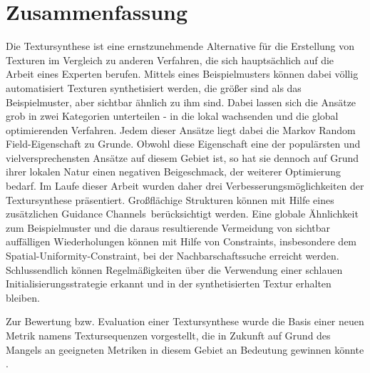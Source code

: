 \section{Zusammenfassung}

Die Textursynthese ist eine ernstzunehmende Alternative für die Erstellung von Texturen im Vergleich zu anderen Verfahren, die sich hauptsächlich auf die Arbeit eines Experten berufen.
Mittels eines Beispielmusters können dabei völlig automatisiert Texturen synthetisiert werden, die größer sind als das Beispielmuster, aber sichtbar ähnlich zu ihm sind.
Dabei lassen sich die Ansätze grob in zwei Kategorien unterteilen - in die lokal wachsenden und die global optimierenden Verfahren.
Jedem dieser Ansätze liegt dabei die \glqq Markov Random Field\grqq -Eigenschaft zu Grunde.
Obwohl diese Eigenschaft eine der populärsten und vielversprechensten Ansätze auf diesem Gebiet ist, so hat sie dennoch auf Grund ihrer lokalen Natur einen negativen Beigeschmack, der weiterer Optimierung bedarf.
Im Laufe dieser Arbeit wurden daher drei Verbesserungsmöglichkeiten der Textursynthese präsentiert.
Großflächige Strukturen können mit Hilfe eines zusätzlichen \glqq Guidance Channels\grqq \ berücksichtigt werden.
Eine globale Ähnlichkeit zum Beispielmuster und die daraus resultierende Vermeidung von sichtbar auffälligen Wiederholungen können mit Hilfe von Constraints, insbesondere dem \glqq Spatial-Uniformity\grqq -Constraint, bei der Nachbarschaftssuche erreicht werden.
Schlussendlich können Regelmäßigkeiten über die Verwendung einer schlauen Initialisierungsstrategie erkannt und in der synthetisierten Textur erhalten bleiben.

Zur Bewertung bzw. Evaluation einer Textursynthese wurde die Basis einer neuen Metrik namens Textursequenzen vorgestellt, die in Zukunft auf Grund des Mangels an geeigneten Metriken in diesem Gebiet an Bedeutung gewinnen könnte \cite{SelfTuning}.